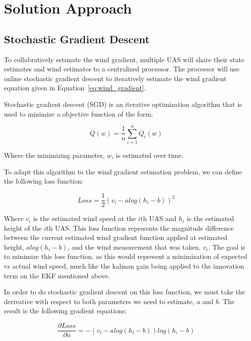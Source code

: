 \section{Solution Approach}

\subsection{Stochastic Gradient Descent}

To collabratively estimate the wind gradient, multiple UAS will share their state estimates and wind estimates to a centralized processor.
The processor will use online stochastic gradient descent to iteratively estimate the wind gradient equation given in Equation~\ref{eq:wind_gradient}.

Stochastic gradient descent (SGD) is an iterative optimization algorithm that is used to minimize a objective function of the form:

\begin{equation}
    Q(w) = \frac{1}{n} \sum_{i=1}^{n} Q_{i}(w)
\end{equation}

Where the minimizing parameter, $w$, is estimated over time.

To adapt this algorithm to the wind gradient estimation problem, we can define the following loss function:

\begin{equation}
    Loss = \frac{1}{2} (v_{i} - a log(h_{i} - b))^2
\end{equation}

Where $v_{i}$ is the estimated wind speed at the $i$th UAS and $h_{i}$ is the estimated height of the $i$th UAS.
This loss function represents the magnitude difference between the current estimated wind gradient function applied at estimated height, $a log(h_{i} - b)$, and the wind measurement that was taken, $v_{i}$.
The goal is to minimize this loss function, as this would represent a minimization of expected vs actual wind speed, much like the kalman gain being applied to the innovation term on the EKF mentioned above.

In order to do stochastic gradient descent on this loss function, we must take the derivative with respect to both parameters we need to estimate, $a$ and $b$.
The result is the following gradient equations:

\begin{equation}
    \frac{\partial Loss}{\partial a} = - (v_{i} - a log(h_{i} - b)) log(h_{i} - b)
\end{equation}

